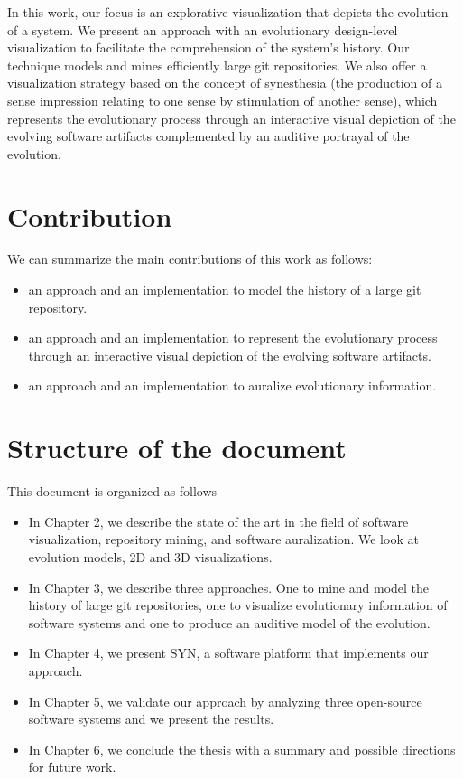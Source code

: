 In this work, our focus is an explorative visualization that depicts the evolution of a system.
We present an approach with an evolutionary design-level visualization to facilitate the comprehension of the system's history. 
Our technique models and mines efficiently large git repositories. We also offer a visualization strategy based on the concept of synesthesia 
(the production of a sense impression relating to one sense by stimulation of another sense), 
which represents the evolutionary process through an interactive visual depiction of the evolving software artifacts complemented by an auditive portrayal of the evolution. 

\section{Contribution}
We can summarize the main contributions of this work as follows:
\begin{itemize}
 \item an approach and an implementation to model the history of a large git repository.
 \item an approach and an implementation to represent the evolutionary process through an interactive visual depiction of the evolving software artifacts.
 \item an approach and an implementation to auralize evolutionary information. 
\end{itemize}

\section{Structure of the document}
This document is organized as follows
\begin{itemize}
 \item In Chapter 2, we describe the state of the art in the field of software visualization, repository mining, and software auralization. We look at evolution models, 2D and 3D visualizations. 
 \item In Chapter 3, we describe three approaches. One to mine and model the history of large git repositories, one to visualize evolutionary information of software systems and one to produce an auditive model of the evolution. 
 \item In Chapter 4, we present SYN, a software platform that implements our approach. 
 \item In Chapter 5, we validate our approach by analyzing three open-source software systems and we present the results. 
 \item In Chapter 6, we conclude the thesis with a summary and possible directions for future work.
 \end{itemize}